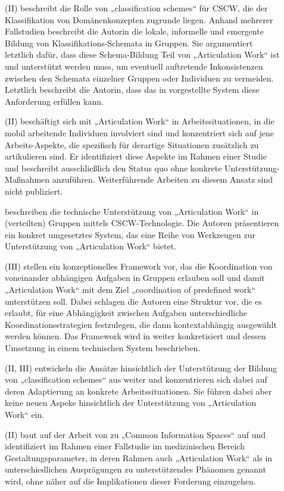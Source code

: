 \begin{description}
	\item[\citet{Simone00}] (II) beschreibt die Rolle von „classification schemes“ für \gls{CSCW}, die der Klassifikation von Domänenkonzepten zugrunde liegen. Anhand mehrerer Fallstudien beschreibt die Autorin die lokale, informelle und emergente Bildung von Klassifikations-Schemata in Gruppen. Sie argumentiert letztlich dafür, dass diese Schema-Bildung Teil von „Articulation Work“ ist und unterstützt werden muss, um eventuell auftretende Inkonsistenzen zwischen den Schemata einzelner Gruppen oder Individuen zu vermeiden. Letztlich beschreibt die Autorin, dass das in \citep{Simone99} vorgestellte System diese Anforderung erfüllen kann. 
	\item[\citet{Christensen01}] (II) beschäftigt sich mit „Articulation Work“ in Arbeitssituationen, in die mobil arbeitende Individuen involviert sind und konzentriert sich auf jene Arbeits-Aspekte, die spezifisch für derartige Situationen zusätzlich zu artikulieren sind. Er identifiziert diese Aspekte im Rahmen einer Studie und beschreibt ausschließlich den Status quo ohne konkrete Unterstützung-Maßnahmen anzuführen. Weiterführende Arbeiten zu diesem Ansatz sind nicht publiziert.
	\item[\citet{Fuchs01}] beschreiben die technische Unterstützung von „Articulation Work“ in (verteilten) Gruppen mittels \gls{CSCW}-Technologie. Die Autoren präsentieren ein konkret umgesetztes System, das eine Reihe von Werkzeugen zur Unterstützung von „Articulation Work“ bietet.
	\item[\citet{Raposo01}] (III) stellen ein konzeptionelles Framework vor, das die Koordination von voneinander abhängigen Aufgaben in Gruppen erlauben soll und damit „Articulation Work“ mit dem Ziel „coordination of predefined work“ unterstützen soll. Dabei schlagen die Autoren eine Struktur vor, die es erlaubt, für eine Abhängigkeit zwischen Aufgaben unterschiedliche Koordinationsstrategien festzulegen, die dann kontextabhängig ausgewählt werden können. Das Framework wird in \citep{Raposo02} weiter konkretisiert und dessen Umsetzung in einem technischen System beschrieben.
	\item[\citet{Simone01}] (II, III) entwickeln die Ansätze hinsichtlich der Unterstützung der Bildung von „classification schemes“ aus \citep{Simone00} weiter und konzentrieren sich dabei auf deren Adaptierung an konkrete Arbeitssituationen. Sie führen dabei aber keine neuen Aspeke hinsichtlich der Unterstützung von „Articulation Work“ ein.
	\item[\citet{Bossen02}] (II) baut auf der Arbeit von \citep{Bannon97} zu „Common Information Spaces“ auf und identifiziert im Rahmen einer Fallstudie im medizinischen Bereich Gestaltungsparameter, in deren Rahmen auch „Articulation Work“ als in unterschiedlichen Ausprägungen zu unterstützendes Phänomen genannt wird, ohne näher auf die Implikationen dieser Forderung einzugehen.

\end{description}

